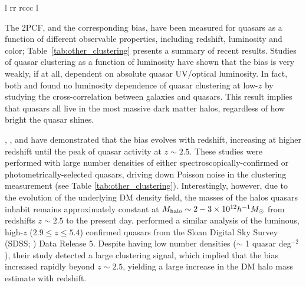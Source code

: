 \documentclass[apj, numberedappendix]{emulateapj}
\begin{document}
\begin{deluxetable*}{l rr rccc l}
\tablewidth{0pt}
\startdata
\label{tab:other_clustering}
\enddata
{}
\end{deluxetable*}

The 2PCF, and the corresponding bias, have been measured for quasars as a function of different observable properties, including redshift, luminosity and color;  Table~\ref{tab:other_clustering} presents a summary of recent results. Studies of quasar clustering as a function of luminosity \citep{daAngela2008, Shen2009, Eft2015, Chehade2016} have shown that the bias is very weakly, if at all, dependent on absolute quasar UV/optical luminosity. In fact, both \citet{Shen2013} and \citet{Krolewski2015} found no luminosity dependence of quasar clustering at low-$z$ by studying the cross-correlation between galaxies and quasars. This result implies that quasars all live in the most massive dark matter halos, regardless of how bright the quasar shines.

\citet{Croom2005}, \citet{Myers2007}, and \citet{Ross2009} have demonstrated that the bias evolves with redshift, increasing at higher redshift until the peak of quasar activity at $z\sim2.5$. These studies were performed with large number densities of either spectroscopically-confirmed or photometrically-selected quasars, driving down Poisson noise in the clustering measurement (see Table \ref{tab:other_clustering}). Interestingly, however, due to the evolution of the underlying DM density field, the masses of the halos quasars inhabit remains approximately constant at $M_{\rm halo}\sim 2-3 \times 10^{12} h^{-1} M_{\odot}$ from redshifts $z\sim2.5$ to the present day. \citet{Shen2007} performed a similar analysis of the luminous, high-$z$ ($2.9 \leq z \leq 5.4$) confirmed quasars from the Sloan Digital Sky Survey (SDSS; \citealt{York2000}) Data Release 5. Despite having low number densities ($\sim$ 1 quasar deg$^{-2}$), their study detected a large clustering signal, which implied that the bias increased rapidly beyond $z\sim2.5$, yielding a large increase in the DM halo mass estimate with redshift. 
\end{document}
